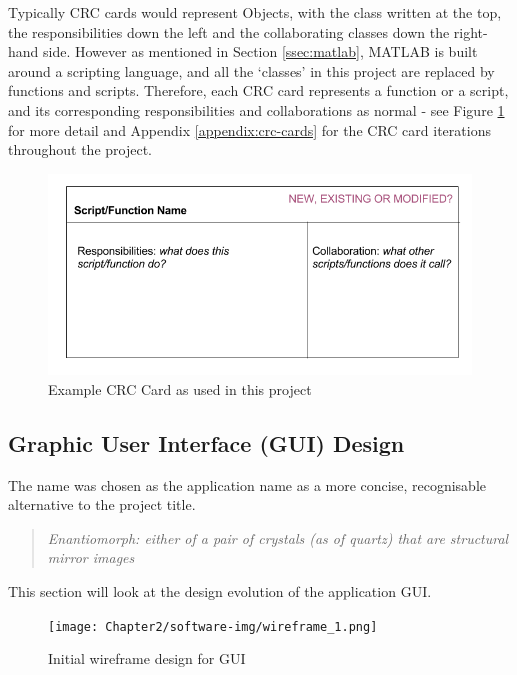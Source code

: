 Typically \acrshort{CRC} cards would represent Objects, with the class written at the top, the responsibilities down the left and the collaborating classes down the right-hand side. However as mentioned in Section \ref{ssec:matlab}, MATLAB is built around a scripting language, and all the `classes' in this project are replaced by functions and scripts. Therefore, each \acrshort{CRC} card represents a function or a script, and its corresponding responsibilities and collaborations as normal - see Figure \ref{fig:crc} for more detail and Appendix \ref{appendix:crc-cards} for the \acrshort{CRC} card iterations throughout the project.

\begin{figure}[H]
  \center
  \includegraphics[scale=0.5]{Chapter2/software-img/crc.png}
  \caption{Example CRC Card as used in this project}
  \label{fig:crc}
\end{figure}

\subsection{Graphic User Interface (GUI) Design}
\label{sssec:gui-design}

The name  was chosen as the application name as a more concise, recognisable alternative to the project title.

\begin{quotation}
  \textit{Enantiomorph: either of a pair of crystals (as of quartz) that are structural mirror images \cite{enantiomorph}}
\end{quotation}

This section will look at the design evolution of the application \acrfull{GUI}.

\begin{figure}[H]
  \center
  \texttt{[image: Chapter2/software-img/wireframe\_1.png]}
  \caption{Initial wireframe design for GUI}
  \label{fig:wireframe1}
\end{figure}


